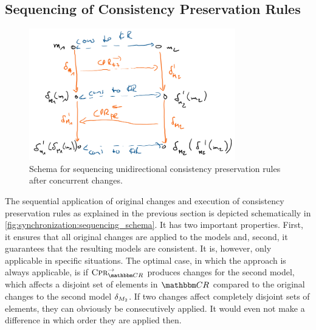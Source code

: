 

\subsection{Sequencing of Consistency Preservation Rules}
\label{chap:synchronization:combination:sequencing}

\begin{figure}
    \centering
    \includegraphics[width=0.8\textwidth]{figures/correctness/synchronization/sequencing_schema.png}
    \caption[Sequencing unidirectional consistency preservation rules]{Schema for sequencing unidirectional consistency preservation rules after concurrent changes.}
    \label{fig:synchronization:sequencing_schema}
\end{figure}

The sequential application of original changes and execution of consistency preservation rules as explained in the previous section is depicted schematically in \autoref{fig:synchronization:sequencing_schema}.
It has two important properties. 
First, it ensures that all original changes are applied to the models and, second, it guarantees that the resulting models are consistent.
It is, however, only applicable in specific situations.
The optimal case, in which the approach is always applicable, is if $\consistencypreservationrule{\consistencyrelationset{CR}}^{\rightarrow}$ produces changes for the second model, which affects a disjoint set of elements in $\consistencyrelationset{CR}$ compared to the original changes to the second model $\delta_{M_{2}}$.
If two changes affect completely disjoint sets of elements, they can obviously be consecutively applied.
It would even not make a difference in which order they are applied then.

